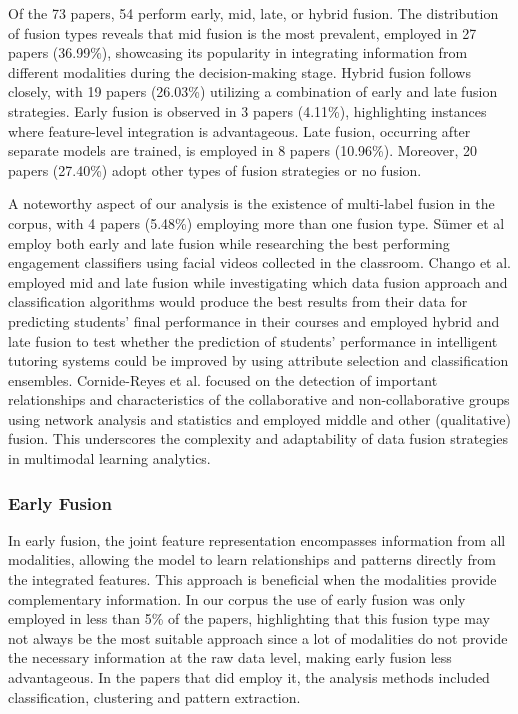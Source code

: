 \documentclass[manuscript,screen,review]{acmart}
\begin{document}
Of the 73 papers, 54 perform early, mid, late, or hybrid fusion. The distribution of fusion types reveals that mid fusion is the most prevalent, employed in 27 papers (36.99\%), showcasing its popularity in integrating information from different modalities during the decision-making stage. Hybrid fusion follows closely, with 19 papers (26.03\%) utilizing a combination of early and late fusion strategies. Early fusion is observed in 3 papers (4.11\%), highlighting instances where feature-level integration is advantageous. Late fusion, occurring after separate models are trained, is employed in 8 papers (10.96\%). Moreover, 20 papers (27.40\%) adopt other types of fusion strategies or no fusion.

A noteworthy aspect of our analysis is the existence of multi-label fusion in the corpus, with 4 papers (5.48\%) employing more than one fusion type. Sümer et al \cite{1315379489} employ both early and late fusion while researching the best performing engagement classifiers using facial videos collected in the classroom. Chango et al. employed mid and late fusion\cite{2936220551} while investigating which data fusion approach and classification algorithms would produce the best results from their data for predicting students’ final performance in their courses and employed hybrid and late fusion\cite{4277812050} to test whether the prediction of students' performance in intelligent tutoring systems could be improved by using attribute selection and classification ensembles. Cornide-Reyes et al. \cite{4019205162} focused on the detection of important relationships and characteristics of the collaborative and non-collaborative groups using network analysis and statistics and employed middle and other (qualitative) fusion. This underscores the complexity and adaptability of data fusion strategies in multimodal learning analytics. 

\subsubsection{Early Fusion}

In early fusion, the joint feature representation encompasses information from all modalities, allowing the model to learn relationships and patterns directly from the integrated features. This approach is beneficial when the modalities provide complementary information. In our corpus the use of early fusion was only employed in less than 5\% of the papers, highlighting that this fusion type may not always be the most suitable approach since a lot of modalities do not provide the necessary information at the raw data level, making early fusion less advantageous. In the papers that did employ it, the analysis methods included classification, clustering and pattern extraction.
\end{document}
